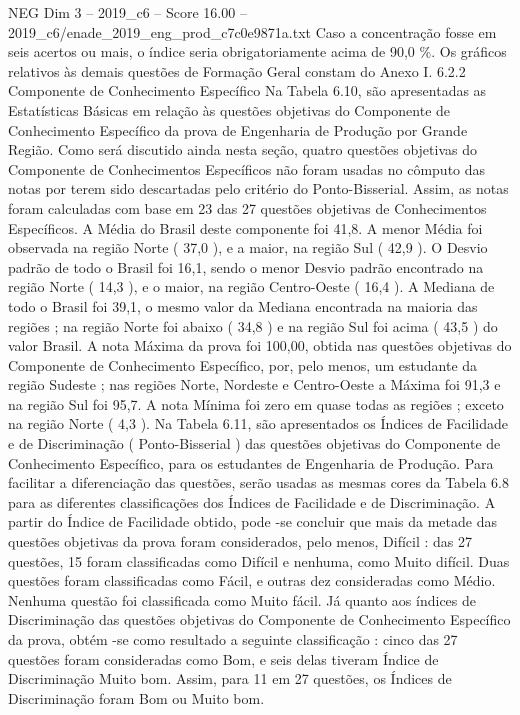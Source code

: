 \begin{textsample}{NEG Dim 3 – 2019\_c6 – Score 16.00 – 2019\_c6/enade\_2019\_eng\_prod\_c7c0e9871a.txt}
Caso a concentração fosse em seis acertos ou mais, o índice seria obrigatoriamente acima de 90,0 \%.
Os gráficos relativos às demais questões de Formação Geral constam do Anexo I. 6.2.2 Componente de Conhecimento Específico Na Tabela 6.10, são apresentadas as Estatísticas Básicas em relação às questões objetivas do Componente de Conhecimento Específico da prova de Engenharia de Produção por Grande Região.
Como será discutido ainda nesta seção, quatro questões objetivas do Componente de Conhecimentos Específicos não foram usadas no cômputo das notas por terem sido descartadas pelo critério do Ponto-Bisserial.
Assim, as notas foram calculadas com base em 23 das 27 questões objetivas de Conhecimentos Específicos.
A Média do Brasil deste componente foi 41,8.
A menor Média foi observada na região Norte ( 37,0 ), e a maior, na região Sul ( 42,9 ).
O Desvio padrão de todo o Brasil foi 16,1, sendo o menor Desvio padrão encontrado na região Norte ( 14,3 ), e o maior, na região Centro-Oeste ( 16,4 ).
A Mediana de todo o Brasil foi 39,1, o mesmo valor da Mediana encontrada na maioria das regiões ; na região Norte foi abaixo ( 34,8 ) e na região Sul foi acima ( 43,5 ) do valor Brasil.
A nota Máxima da prova foi 100,00, obtida nas questões objetivas do Componente de Conhecimento Específico, por, pelo menos, um estudante da região Sudeste ; nas regiões Norte, Nordeste e Centro-Oeste a Máxima foi 91,3 e na região Sul foi 95,7.
A nota Mínima foi zero em quase todas as regiões ; exceto na região Norte ( 4,3 ).
Na Tabela 6.11, são apresentados os Índices de Facilidade e de Discriminação ( Ponto-Bisserial ) das questões objetivas do Componente de Conhecimento Específico, para os estudantes de Engenharia de Produção.
Para facilitar a diferenciação das questões, serão usadas as mesmas cores da Tabela 6.8 para as diferentes classificações dos Índices de Facilidade e de Discriminação.
A partir do Índice de Facilidade obtido, pode -se concluir que mais da metade das questões objetivas da prova foram considerados, pelo menos, Difícil : das 27 questões, 15 foram classificadas como Difícil e nenhuma, como Muito difícil.
Duas questões foram classificadas como Fácil, e outras dez consideradas como Médio.
Nenhuma questão foi classificada como Muito fácil.
Já quanto aos índices de Discriminação das questões objetivas do Componente de Conhecimento Específico da prova, obtém -se como resultado a seguinte classificação : cinco das 27 questões foram consideradas como Bom, e seis delas tiveram Índice de Discriminação Muito bom.
Assim, para 11 em 27 questões, os Índices de Discriminação foram Bom ou Muito bom.

\end{textsample}
